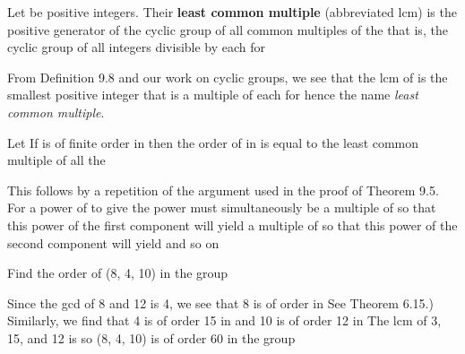 \documentclass[11pt,oneside]{article}
\begin{document}
\begin{BookBody}
 Let  be positive integers. Their\textbf{ least common multiple} (abbreviated lcm) is the positive generator of the cyclic group of all common multiples of the  that is, the cyclic group of all integers divisible by each  for \BookEnd{\blacksquare}

\end{BookBody}

\BookNarrativetrue

\begin{BookBody}

From Definition 9.8 and our work on cyclic groups, we see that the lcm of  is the smallest positive integer that is a multiple of each  for   hence the name\textit{ least common multiple}.

 Let  If  is of finite order  in  then the order of  in  is equal to the least common multiple of all the 

 This follows by a repetition of the argument used in the proof of Theorem 9.5. For a power of  to give  the power must simultaneously be a multiple of  so that this power of the first component  will yield  a multiple of  so that this power of the second component  will yield  and so on\BookEnd{\blacklozenge}

 Find the order of (8, 4, 10) in the group 

 Since the gcd of 8 and 12 is 4, we see that 8 is of order  in See Theorem 6.15.) Similarly, we find that 4 is of order 15 in  and 10 is of order 12 in  The lcm of 3, 15, and 12 is  so (8, 4, 10) is of order 60 in the group \BookEnd{\blacktriangle}


\end{BookBody}
\end{document}
